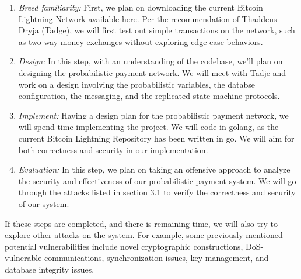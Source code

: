 \documentclass[11pt]{article}
\begin{document}
\begin{enumerate}
    \item \textit{Breed familiarity:} First, we plan on downloading the current Bitcoin Lightning Network available here\cite{LIT}. Per the recommendation of Thaddeus Dryja (Tadge), we will first test out simple transactions on the network, such as two-way money exchanges without exploring edge-case behaviors. 
    
    \item \textit{Design:} In this step, with an understanding of the codebase, we'll plan on designing the probabilistic payment network. We will meet with Tadje and work on a design involving the probabilistic variables, the databse configuration, the messaging, and the replicated state machine protocols. 
    
    \item \textit{Implement:} Having a design plan for the probabilistic payment network, we will spend time implementing the project. We will code in golang, as the current Bitcoin Lightning Repository has been written in go. We will aim for both correctness and security in our implementation. 
    
    \item \textit{Evaluation:} In this step, we plan on taking an offensive approach to analyze the security and effectiveness of our probabilistic payment system. We will go through the attacks listed in section 3.1 to verify the correctness and security of our system.
    
\end{enumerate}

\noindent If these steps are completed, and there is remaining time, we will also try to explore other attacks on the system. For example, some previously mentioned potential vulnerabilities include novel cryptographic constructions, DoS-vulnerable communications, synchronization issues, key management, and database integrity issues. 

\end{document}
